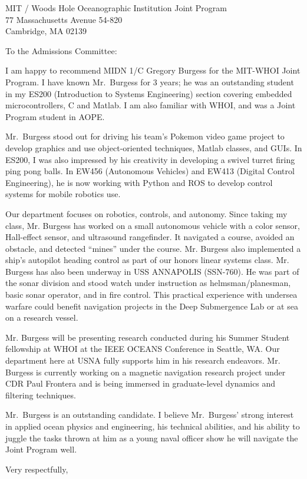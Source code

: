 \documentclass[12pt]{wrceletter}
\date{\today}
\begin{document}
\begin{letter}{%
MIT / Woods Hole Oceanographic Institution Joint Program\\
77 Massachusetts Avenue 54-820\\
Cambridge, MA 02139}

\opening{To the Admissions Committee:}
\raggedright %
\setlength{\parindent}{15pt} %

I am happy to recommend MIDN 1/C Gregory Burgess for the MIT-WHOI Joint Program. I have known Mr.~Burgess for 3 years; he was an outstanding student in my ES200 (Introduction to Systems Engineering) section covering embedded microcontrollers, C and Matlab. I am also familiar with WHOI, and was a Joint Program student in AOPE. 

Mr.~Burgess stood out for driving his team's Pokemon video game project to develop graphics and use object-oriented techniques, Matlab classes, and GUIs. In ES200, I was also impressed by his creativity in developing a swivel turret firing ping pong balls. In EW456 (Autonomous Vehicles) and EW413 (Digital Control Engineering), he is now working with Python and ROS to develop control systems for mobile robotics use.

Our department focuses on robotics, controls, and autonomy. Since taking my class, Mr. Burgess has worked on a small autonomous vehicle with a color sensor, Hall-effect sensor, and ultrasound rangefinder. It navigated a course, avoided an obstacle, and detected ``mines'' under the course. Mr. Burgess also implemented a ship’s autopilot heading control as part of our honors linear systems class. Mr. Burgess has also been underway in USS ANNAPOLIS (SSN-760). He was part of the sonar division and stood watch under instruction as helmsman/planesman, basic sonar operator, and in fire control. This practical experience with undersea warfare could benefit navigation projects in the Deep Submergence Lab or at sea on a research vessel.

Mr. Burgess will be presenting research conducted during his Summer Student fellowship at WHOI at the IEEE OCEANS Conference in Seattle, WA. Our department here at USNA fully supports him in his research endeavors. Mr. Burgess is currently working on a magnetic navigation research project under CDR Paul Frontera and is being immersed in graduate-level dynamics and filtering techniques. 

Mr.~Burgess is an outstanding candidate. I believe Mr.~Burgess' strong interest in applied ocean physics and engineering, his technical abilities, and his ability to juggle the tasks thrown at him as a young naval officer show he will navigate the Joint Program well. 

\closing{Very respectfully,} %

\end{letter}
\end{document}
